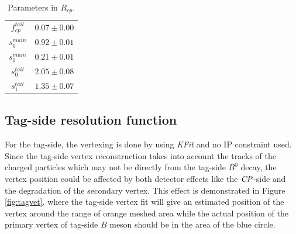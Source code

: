 \begin{table}[H]
	\begin{minipage}[b]{1.0\linewidth}
		\centering
		\caption{Parameters in $R_{cp}$.}
		\label{tab:Rcp}
		\begin{tabular}{|c|c|}
			\hline
			$f_{cp}^{tail}$ & $0.07 \pm 0.00$\\
			$s_0^{main}$&  $0.92 \pm 0.01$ \\
			$s_1^{main}$ & $0.21\pm 0.01$\\
			$s_0^{tail}$ &  $2.05\pm 0.08$\\
			$s_1^{tail}$  & $1.35\pm 0.07$ \\
			\hline
		\end{tabular}
	\end{minipage}
\end{table}

\subsection{Tag-side resolution function}

For the tag-side, the vertexing is done by using \textit{KFit} and no IP constraint used. Since the tag-side vertex reconstruction takes into account the tracks of the charged particles which may not be directly from the tag-side $B^0$ decay, the vertex position could be affected by both detector effects like the $\it{CP}$-side and the degradation of the secondary vertex. This effect is demonstrated in Figure \ref{fig:tagvet}. where the tag-side vertex fit will give an estimated position of the vertex around the range of orange meshed area while the actual position of the primary vertex of tag-side $B$ meson should be in the area of the blue circle.

